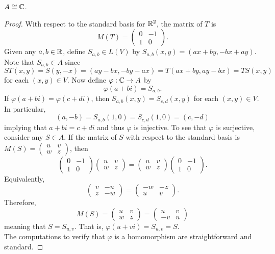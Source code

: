 \documentclass[../../AlgebraQualSolutions.tex]{subfiles}
\begin{document}
\begin{claim}
    $A \cong \mathbb{C}$.
    
    \begin{proof}
        With respect to the standard basis for $\mathbb{R}^2$, the matrix of $T$ is
            \[M(T) = \begin{pmatrix} 0 & -1 \\ 1 & 0\end{pmatrix}.\]
        Given any $a,b \in \mathbb{R}$, define $S_{a,b} \in L(V)$ by $S_{a,b}(x,y) = (ax+by,-bx+ay)$. Note that $S_{a,b} \in A$ since
            \[ST(x,y) = S(y,-x) = (ay-bx, -by -ax) = T(ax+by, ay-bx) = TS(x,y)\]
        for each $(x,y) \in V$. Now define $\varphi: \mathbb{C} \to A$ by 
            \[\varphi(a+bi) = S_{a,b}.\]
        If $\varphi(a+bi) = \varphi(c+di)$, then $S_{a,b}(x,y) = S_{c,d}(x,y)$ for each $(x,y) \in V$. In particular,
            \[(a,-b) = S_{a,b}(1,0) = S_{c,d}(1,0) = (c,-d)\]
        implying that $a+bi=c+di$ and thus $\varphi$ is injective. To see that $\varphi$ is surjective, consider any $S \in A$. If the matrix of $S$ with respect to the standard basis is $M(S) = \begin{pmatrix} u & v \\ w & z\end{pmatrix}$, then
            \[\begin{pmatrix} 0 & -1 \\ 1 & 0\end{pmatrix}\begin{pmatrix} u & v \\ w & z\end{pmatrix} = \begin{pmatrix} u & v \\ w & z\end{pmatrix}\begin{pmatrix} 0 & -1 \\ 1 & 0\end{pmatrix}.\]
        Equivalently,
            \[\begin{pmatrix} v & -u \\ z & -w\end{pmatrix} = \begin{pmatrix} -w & -z \\ u & v\end{pmatrix}.\]
        Therefore,
            \[M(S) = \begin{pmatrix} u & v \\ w & z\end{pmatrix} = \begin{pmatrix} u & v \\ -v & u\end{pmatrix}\]
        meaning that $S = S_{u,v}$. That is, $\varphi(u +vi) = S_{u,v} = S$.\\

        The computations to verify that $\varphi$ is a homomorphism are straightforward and standard.
    \end{proof}
\end{claim}
\end{document}
